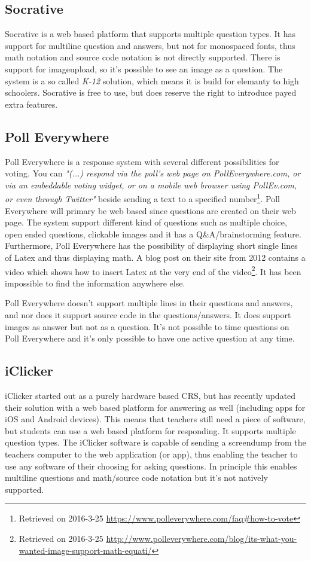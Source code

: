 \subsection*{Socrative}
Socrative is a web based platform that supports multiple question types. It has support for multiline question and answers, but not for monospaced fonts, thus math notation and source code notation is not directly supported. There is support for imageupload, so it's possible to see an image as a question. The system is a so called \emph{K-12} solution, which means it is build for elemanty to high schoolers. Socrative is free to use, but does reserve the right to introduce payed extra features.

\subsection*{Poll Everywhere}
Poll Everywhere is a response system with several different possibilities for voting. You can \emph{"(...) respond via the poll's web page on PollEverywhere.com, or via an embeddable voting widget, or on a mobile web browser using PollEv.com, or even through Twitter"} beside sending a text to a specified number\footnote{Retrieved on 2016-3-25 \url{https://www.polleverywhere.com/faq\#how-to-vote}}. Poll Everywhere will primary be web based since questions are created on their web page. The system support different kind of questions such as multiple choice, open ended questions, clickable images and it has a Q\&A/brainstorming feature. Furthermore, Poll Everywhere has the possibility of displaying short single lines of Latex and thus displaying math. A blog post on their site from 2012 contains a video which shows how to insert Latex at the very end of the video\footnote{Retrieved on 2016-3-25 \url{http://www.polleverywhere.com/blog/its-what-you-wanted-image-support-math-equati/}}. It has been impossible to find the information anywhere else.

Poll Everywhere doesn't support multiple lines in their questions and answers, and nor does it support source code in the questions/answers. It does support images as answer but not as a question. It's not possible to time questions on Poll Everywhere and it's only possible to have one active question at any time. 

\subsection*{iClicker}
iClicker started out as a purely hardware based CRS, but has recently updated their solution with a web based platform for answering as well (including apps for iOS and Android devices). This means that teachers still need a piece of software, but students can use a web based platform for responding. It supports multiple question types. The iClicker software is capable of sending a screendump from the teachers computer to the web application (or app), thus enabling the teacher to use any software of their choosing for asking questions. In principle this enables multiline questions and math/source code notation but it's not natively supported. 

